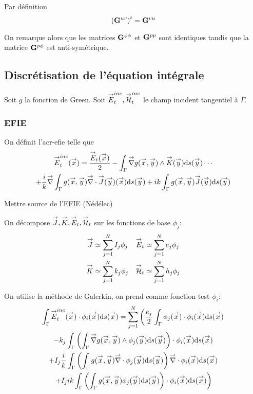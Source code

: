    \begin{prop}
      Par définition
      \begin{equation}
        \left(\mathbf{G}^{uv}\right)^t = \mathbf{G}^{vu}
      \end{equation}
    \end{prop}

    On remarque alors que les matrices \(\mathbf{G}^{\phi\phi}\) et \(\mathbf{G}^{pp}\) sont identiques tandis que la matrice \(\mathbf{G}^{p\phi}\) est anti-symétrique.

  \subsection{Discrétisation de l'équation intégrale}
    Soit \(g\) la fonction de Green. Soit \({\overset{\rightarrow}{E}}^{inc}_t,{\overset{\rightarrow}{\mathcal{H}}}^{inc}_t\) le champ incident tangentiel à \(\Gamma\).

    \subsubsection{EFIE}
      On définit l'\gls{acr-efie} telle que
      \begin{multline}
        \label{eq:form_int:EFIE}
        \vE^{inc}_t(\vx) =
          \frac{\vE_t(\vx)}{2} 
            - \int_\Gamma \vgrad g(\vx,\vy) \pvect \vK(\vy) \dd{s}(\vy) \cdots \\
          + \frac{i}{k}\vgrad \int_\Gamma  g(\vx,\vy)\vdiv\vJ(\vy)(\vx) \dd{s}(\vy)
            +  ik\int_\Gamma g(\vx,\vy)\vJ(\vy) \dd{s}(\vy)
      \end{multline}
      \begin{TODO}
        Mettre source de l'EFIE (Nédélec)
      \end{TODO}

      On décompose \({\overset{\rightarrow}{J}},{\overset{\rightarrow}{K}},{\overset{\rightarrow}{E}}_t,{\overset{\rightarrow}{\mathcal{H}}}_t\) sur les fonctions de base \(\phi_j\):
      \begin{subequations}
        \begin{align}
          {\overset{\rightarrow}{J}} &\simeq \sum_{j=1}^N I_j \phi_j & {\overset{\rightarrow}{E}}_t &\simeq \sum_{j=1}^N e_j \phi_j\\
          {\overset{\rightarrow}{K}} &\simeq \sum_{j=1}^N k_j \phi_j & {\overset{\rightarrow}{\mathcal{H}}}_t &\simeq \sum_{j=1}^N h_j \phi_j
        \end{align}
      \end{subequations}

      On utilise la méthode de Galerkin, on prend comme fonction test \(\phi_i\): 
      \begin{multline}
      \int_\Gamma {\overset{\rightarrow}{E}}^{inc}_t({\overset{\rightarrow}{x}}) \cdot \phi_i({\overset{\rightarrow}{x}}) \mathrm{d}{s}({\overset{\rightarrow}{x}}) = \sum_{j=1}^{N} \left( 
        \dfrac{e_j}{2} \int_\Gamma \phi_j({\overset{\rightarrow}{x}}) \cdot \phi_i({\overset{\rightarrow}{x}}) \mathrm{d}{s}({\overset{\rightarrow}{x}})\right. \\
        -  k_j \int_\Gamma\left(\int_\Gamma {\overset{\rightarrow}{\nabla}} g({\overset{\rightarrow}{x}},{\overset{\rightarrow}{y}}) \wedge \phi_j({\overset{\rightarrow}{y}}) \mathrm{d}{s}({\overset{\rightarrow}{y}})\right) \cdot \phi_i({\overset{\rightarrow}{x}}) \mathrm{d}{s}({\overset{\rightarrow}{x}}) \\
        + I_j\dfrac{i}{k}\int_\Gamma
          \left(\int_\Gamma g({\overset{\rightarrow}{x}},{\overset{\rightarrow}{y}}){\overset{\rightarrow}{\nabla}}\cdot\phi_j({\overset{\rightarrow}{y}}) \mathrm{d}{s}({\overset{\rightarrow}{y}})\right) {\overset{\rightarrow}{\nabla}}\cdot \phi_i({\overset{\rightarrow}{x}}) \mathrm{d}{s}({\overset{\rightarrow}{x}}) \\
      \left.
        + I_j ik \int_\Gamma \left(\int_\Gamma g({\overset{\rightarrow}{x}},{\overset{\rightarrow}{y}})\phi_j({\overset{\rightarrow}{y}}) \mathrm{d}{s}({\overset{\rightarrow}{y}})\right)\cdot \phi_i({\overset{\rightarrow}{x}}) \mathrm{d}{s}({\overset{\rightarrow}{x}})
      \right)
      \end{multline}

